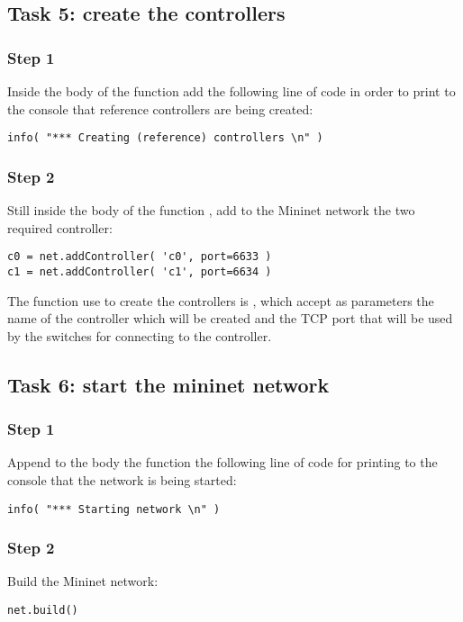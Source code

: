 \subsection*{Task 5: create the controllers}
\subsubsection*{Step 1}
Inside the body of the function  add the following line
of code in order to print to the console that reference controllers are being created:
\begin{lstlisting}
info( "*** Creating (reference) controllers \n" )
\end{lstlisting}

\subsubsection*{Step 2}
Still inside the body of the function , add to the
Mininet network the two required controller:
\begin{lstlisting}
c0 = net.addController( 'c0', port=6633 )
c1 = net.addController( 'c1', port=6634 )
\end{lstlisting}

The function use to create the controllers is , which accept
as parameters the name of the controller which will be created and the TCP port that
will be used by the switches for connecting to the controller.







\subsection*{Task 6: start the mininet network}
\subsubsection*{Step 1}
Append to the body the function  the following line
of code for printing to the console that the network is being started:
\begin{lstlisting}
info( "*** Starting network \n" )
\end{lstlisting}

\subsubsection*{Step 2}
Build the Mininet network:
\begin{lstlisting}
net.build()
\end{lstlisting}


